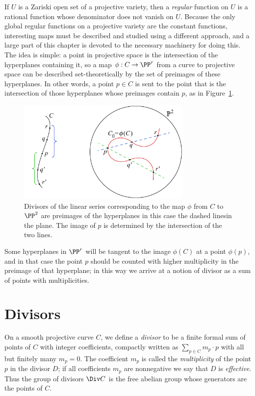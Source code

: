 If $U$ is a Zariski open set of a projective variety, then a \emph{regular} function on $U$
is a rational function whose denominator does not vanish on $U$.
Because the only global regular functions on a projective variety are the  constant functions,
interesting maps must be described and studied using
a different approach, and a large part of this chapter is devoted to the necessary machinery for doing this. The idea is simple: a point in projective space is the intersection of the hyperplanes containing it, so a map $\phi: C\to \PP^r$ from a curve to projective space can be described set-theoretically
%
by the set of preimages of these hyperplanes.
In other words, a point $p\in C$ is sent to the point
that is the intersection of those hyperplanes whose preimages contain $p$, as in Figure~\ref{set-theoretic map}.

\begin{figure}[b]
\centerline {\includegraphics[height=2in]{"main/Fig01-1"}}
 \caption{Divisors of the linear series corresponding to the map
   $\phi$ from $C$
to $\PP^2$ are preimages of the hyperplanes\emdash
   in this case the dashed lines\emdash in the plane.
 The image of $p$ is determined by the intersection of the two lines.
}
\label{set-theoretic map}
\end{figure}


Some hyperplanes in $\PP^{r}$ will be tangent to the image $\phi(C)$ at a point $\phi(p)$, and in that case the point $p$ should be counted with higher multiplicity in the preimage of that hyperplane; in
this way we arrive at a notion of divisor as a sum of points with multiplicities.

\section{Divisors}

On a smooth projective curve $C$, we define a \emph{divisor} to be a
finite formal sum of points of $C$ with integer coefficients,
compactly written
as $\sum_{p\in C} m_p\cdot p$ with all but
finitely many $m_p=0$.  The coefficient $m_p$ is called the
\emph{multiplicity} of the point $p$ in the divisor $D$; if all
coefficients $m_p$ are nonnegative we say that $D$ is
\emph{effective}. Thus the group of divisors $\Div C$ is the free
abelian group whose generators
%
%
%
%
are the points of $C$.


